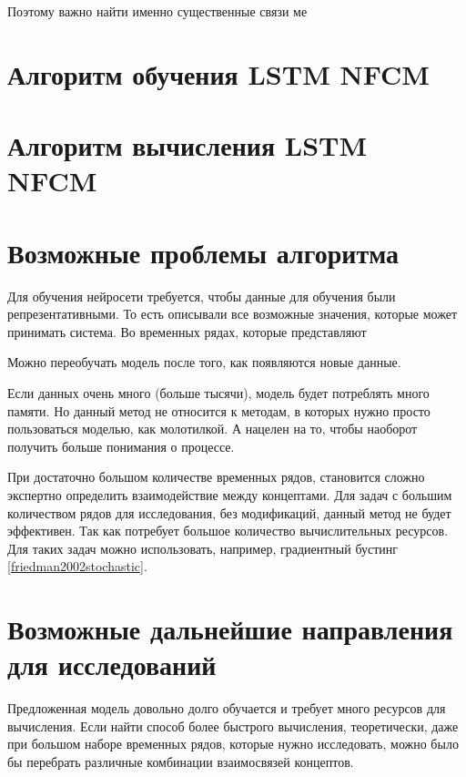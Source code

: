Поэтому важно найти именно существенные связи ме



\section{Алгоритм обучения LSTM NFCM}




\section{Алгоритм вычисления LSTM NFCM}


\section{Возможные проблемы алгоритма}

Для обучения  нейросети требуется, чтобы
данные для обучения были репрезентативными. То есть
описывали все возможные значения, которые может принимать система.
Во временных рядах, которые представляют

Можно переобучать модель после того, как появляются новые данные.

Если данных очень много (больше тысячи), модель будет потреблять много памяти.
Но данный метод не относится к методам, в которых нужно просто
пользоваться моделью, как молотилкой. А нацелен на то, чтобы наоборот
получить больше понимания о процессе.

При достаточно большом количестве временных рядов,
становится сложно экспертно определить взаимодействие между концептами.
Для задач с большим количеством рядов для исследования, без
модификаций, данный метод не будет эффективен. Так как потребует
большое количество вычислительных ресурсов.
Для таких задач можно использовать, например, градиентный бустинг \ref{friedman2002stochastic}.

\section{Возможные дальнейшие направления для исследований}

Предложенная модель довольно долго обучается и требует много ресурсов
для вычисления. Если найти способ более быстрого вычисления,
теоретически, даже при большом наборе временных рядов, которые нужно
исследовать, можно было бы перебрать различные комбинации взаимосвязей концептов.


